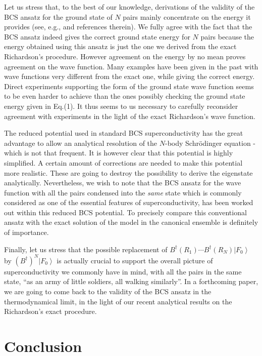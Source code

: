 \documentclass[aps,prb,superscriptaddress,showpacs,reprint,lengthcheck]{revtex4-1}
\begin{document}
Let us stress that, 
to the best of our knowledge,  derivations of the validity of the BCS ansatz for the ground state of $N$ pairs
mainly concentrate on the energy it provides 
(see, e.g., \cite{Schrieffer} and references therein).
 We fully agree with the fact that the BCS
ansatz indeed gives the correct ground state energy for $N$ pairs because the energy obtained using this ansatz
is just the one we derived from the exact Richardson's procedure. However
agreement on the energy by no mean proves agreement on the wave function.
Many examples have been given in the past with wave functions very different
from the exact one, while giving the correct energy. Direct
experiments supporting the form of the ground state wave function seems to be even harder to achieve than the ones possibly checking the ground state energy given in Eq.(1). 
It thus seems to us necessary to carefully reconsider agreement 
with experiments in the light of the exact Richardson's wave function. 

The reduced potential used in standard BCS superconductivity has the great advantage to allow an analytical resolution of the $N$-body Schr\"{o}dinger equation - which is not that frequent. It is however clear that this potential is highly simplified. A certain amount of corrections are needed to make this potential more realistic. These are going to destroy the possibility to derive the eigenstate analytically. Nevertheless, we wish to note that  the BCS ansatz for the wave function with all the pairs condensed into the \emph{same} state which is commonly considered as one of the essential features of superconductivity, has been worked out within this reduced BCS potential. To precisely compare this conventional ansatz with the exact solution of the model in the canonical ensemble is definitely of importance.

Finally, let us stress that the possible replacement of $B^{\dagger}(R_1)\cdots{}B^{\dagger}(R_N)%
\left|F_0\right>  $ by $\left(B^{\dagger}\right) ^N\left|F_0\right>  $ is
actually crucial to support the overall picture of
superconductivity we commonly have in mind, with all the pairs in the same state, ``as an army of
little soldiers, all walking similarly''. 
In a forthcoming paper, we are going to come back to the validity of the BCS 
ansatz in the thermodynamical limit, in the light of our recent analytical results on the Richardson's exact procedure.

\section{Conclusion}
\end{document}
